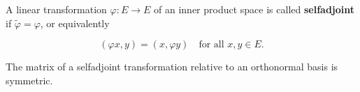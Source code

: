 A linear transformation $\varphi: E \rightarrow E$ of an inner product space is called \textbf{selfadjoint} if $\tilde{\varphi} = \varphi$, or equivalently

$$(\varphi x, y) = (x, \varphi y) \quad \text{for all } x, y \in E.$$

The matrix of a selfadjoint transformation relative to an orthonormal basis is symmetric.
